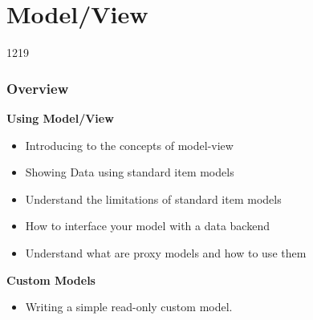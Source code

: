 %
%
%
%

\section{Model/View}

\begin{slide}{1219}
  \label{model-view-programming}
  \frametitle{Overview}
  
  \textbf{Using Model/View} 
  \begin{itemize}
  \item Introducing to the concepts of model-view
  \item Showing Data using standard item models
  \item Understand the limitations of standard item models
  \item How to interface your model with a data backend
  \item Understand what are proxy models and how to use them
 \end{itemize}
  \textbf{Custom Models} 
  \begin{itemize}
  \item Writing a simple read-only custom model.
 \end{itemize}
\end{slide}





%
%
